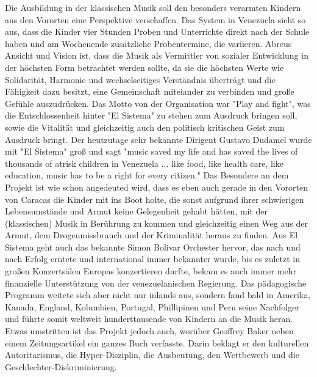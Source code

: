 Die Ausbildung in der klassischen Musik soll den besonders verarmten Kindern aus den Vororten
eine Perspektive verschaffen. Das System in Venezuela sieht so aus, dass die
Kinder vier Stunden Proben und Unterrichte direkt nach der Schule haben und am
Wochenende zusätzliche Probentermine, die variieren. Abreus Ansicht und Vision ist, dass die
Musik als Vermittler von sozialer Entwicklung in der höchsten Form betrachtet
werden sollte, da sie die höchsten Werte wie Solidarität, Harmonie und
wechselseitiges Verständnis überträgt und die Fähigkeit dazu besitzt, eine
Gemeinschaft miteiander zu verbinden und große Gefühle auszudrücken. Das Motto
von der Organisation war "Play and fight", was die Entschlossenheit hinter "El
Sistema" zu stehen zum Ausdruck bringen soll, sowie die Vitalität und
gleichzeitig auch den politisch kritischen Geist zum Ausdruck bringt. Der
heutzutage sehr bekannte Dirigent Gustavo Dudamel wurde mit "El Sistema" groß
und sagt "music saved my life and has saved the lives of thousands of atrisk
children in Venezuela ... like food, like health care, like education, music has
to be a right for every citizen."%
Das Besondere an dem Projekt ist wie schon angedeuted wird, dass es eben auch
gerade in den Vororten von Caracas die Kinder mit ins Boot holte, die sonst
aufgrund ihrer schwierigen Lebensumstände und Armut keine Gelegenheit gehabt
hätten, mit der (klassischen) Musik in Berührung zu kommen und gleichzeitig
einen Weg aus der Armut, dem Drogenmissbrauch und der Kriminalität heraus zu
finden. Aus El Sistema geht auch das bekannte Simon Bolivar Orchester hervor,
das nach und nach Erfolg erntete und international
immer bekannter wurde, bis es zuletzt in großen Konzertsälen Europas
konzertieren durfte, bekam es auch immer mehr finanzielle Unterstützung von der
venezuelanischen Regierung. Das pädagogische Programm weitete sich aber nicht
nur inlands aus, sondern fand bald in Amerika, Kanada, England, Kolumbien,
Portugal, Phillipinen und Peru seine Nachfolger und führte somit weltweit
hunderttausende von Kindern an die Musik heran. Etwas umstritten ist das Projekt
jedoch auch, worüber Geoffrey Baker neben einem Zeitungsartikel ein ganzes
Buch verfasste. Darin beklagt er den kulturellen Autoritarismus, die
Hyper-Disziplin, die Ausbeutung, den Wettbewerb und die
Geschlechter-Diskriminierung. 

